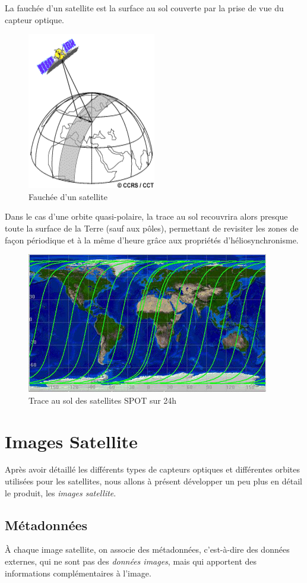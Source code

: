 \documentclass[a4paper, 11pt]{report}
\begin{document}
La fauchée d'un satellite est la surface au sol couverte par la prise de vue du capteur optique.
\begin{figure}[H]
	\centering
	\includegraphics[scale=0.5]{Images/Swath.png}
	\caption{Fauchée d'un satellite}
\end{figure}
Dans le cas d'une orbite quasi-polaire, la trace au sol recouvrira alors presque toute la surface de la Terre (sauf aux pôles), permettant de revisiter les zones de façon périodique et à la même d'heure grâce aux propriétés d'héliosynchronisme.
\begin{figure}[H]
	\centering
	\includegraphics[scale=0.6]{Images/Trace_Sol_SPOT.jpg}
	\caption{Trace au sol des satellites SPOT sur 24h}
\end{figure}
\section{Images Satellite}
Après avoir détaillé les différents types de capteurs optiques et différentes orbites utilisées pour les satellites, nous allons à présent développer un peu plus en détail le produit, les \emph{images satellite}.

\subsection{Métadonnées}
À chaque image satellite, on associe des métadonnées, c'est-à-dire des données externes, qui ne sont pas des \emph{données images}, mais qui apportent des informations complémentaires à l'image.
\end{document}

